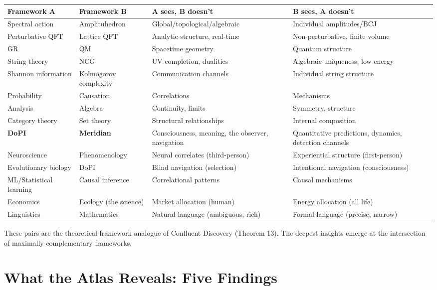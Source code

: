 \begin{longtable}{p{} p{} p{} p{}}
\toprule
\textbf{Framework A} & \textbf{Framework B} & \textbf{A sees, B doesn't} & \textbf{B sees, A doesn't} \\
\midrule
\endhead
Spectral action & Amplituhedron & Global/topological/algebraic & Individual amplitudes/BCJ \\
Perturbative QFT & Lattice QFT & Analytic structure, real-time & Non-perturbative, finite volume \\
GR & QM & Spacetime geometry & Quantum structure \\
String theory & NCG & UV completion, dualities & Algebraic uniqueness, low-energy \\
Shannon information & Kolmogorov complexity & Communication channels & Individual string structure \\
Probability & Causation & Correlations & Mechanisms \\
Analysis & Algebra & Continuity, limits & Symmetry, structure \\
Category theory & Set theory & Structural relationships & Internal composition \\
\textbf{DoPI} & \textbf{Meridian} & Consciousness, meaning, the observer, navigation & Quantitative predictions, dynamics, detection channels \\
Neuroscience & Phenomenology & Neural correlates (third-person) & Experiential structure (first-person) \\
Evolutionary biology & DoPI & Blind navigation (selection) & Intentional navigation (consciousness) \\
ML/Statistical learning & Causal inference & Correlational patterns & Causal mechanisms \\
Economics & Ecology (the science) & Market allocation (human) & Energy allocation (all life) \\
Linguistics & Mathematics & Natural language (ambiguous, rich) & Formal language (precise, narrow) \\
\bottomrule
\end{longtable}



These pairs are the theoretical-framework analogue of Confluent Discovery (Theorem 13). The deepest insights emerge at the intersection of maximally complementary frameworks.


\section*{What the Atlas Reveals: Five Findings}


